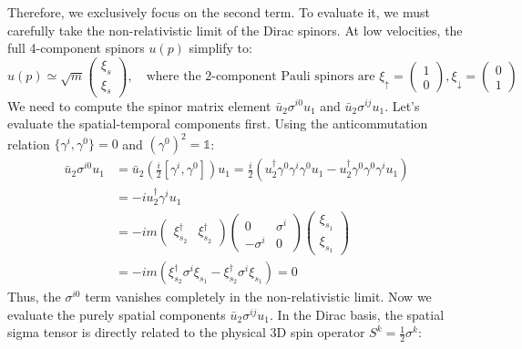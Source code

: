 Therefore, we exclusively focus on the second term. To evaluate it, we must carefully take the non-relativistic limit of the Dirac spinors. At low velocities, the full 4-component spinors $u(p)$ simplify to:
\[
    u(p) \simeq \sqrt{m} \begin{pmatrix} \xi_s \\ \xi_s \end{pmatrix}, \quad \text{where the 2-component Pauli spinors are } \xi_{\uparrow} = \begin{pmatrix} 1 \\ 0 \end{pmatrix}, \xi_{\downarrow} = \begin{pmatrix} 0 \\ 1 \end{pmatrix}
\]
We need to compute the spinor matrix element $\bar{u}_2 \sigma^{i0} u_1$ and $\bar{u}_2 \sigma^{ij} u_1$. Let's evaluate the spatial-temporal components first. Using the anticommutation relation $\{\gamma^i, \gamma^0\} = 0$ and $(\gamma^0)^2 = \mathbb{1}$:
\[
    \begin{aligned}
        \bar{u}_2 \sigma^{i0} u_1 & = \bar{u}_2 \left( \frac{i}{2} [\gamma^i, \gamma^0] \right) u_1 = \frac{i}{2} ( u_2^\dagger \gamma^0 \gamma^i \gamma^0 u_1 - u_2^\dagger \gamma^0 \gamma^0 \gamma^i u_1 )                   \\
                                  & = -i u_2^\dagger \gamma^i u_1                                                                                                                                                               \\
                                  & = -i m \begin{pmatrix} \xi_{s_2}^\dagger & \xi_{s_2}^\dagger \end{pmatrix} \begin{pmatrix} 0 & \sigma^i \\ -\sigma^i & 0 \end{pmatrix} \begin{pmatrix} \xi_{s_1} \\ \xi_{s_1} \end{pmatrix} \\
                                  & = -i m ( \xi_{s_2}^\dagger \sigma^i \xi_{s_1} - \xi_{s_2}^\dagger \sigma^i \xi_{s_1} ) = 0
    \end{aligned}
\]
Thus, the $\sigma^{i0}$ term vanishes completely in the non-relativistic limit. Now we evaluate the purely spatial components $\bar{u}_2 \sigma^{ij} u_1$. In the Dirac basis, the spatial sigma tensor is directly related to the physical 3D spin operator $S^k = \frac{1}{2}\sigma^k$:
